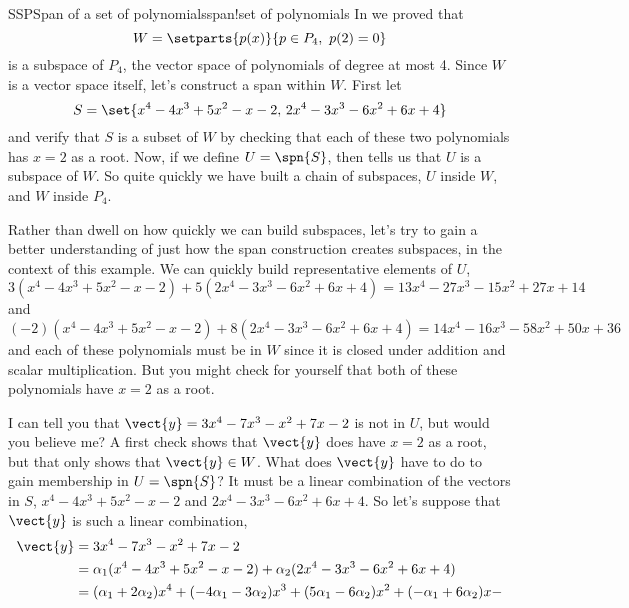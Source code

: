 \begin{example}{SSP}{Span of a set of polynomials}{span!set of polynomials}
In  we proved that
%
\begin{equation*}
W=\setparts{p(x)}{p\in P_4,\ p(2)=0}
\end{equation*}
%
is a subspace of $P_4$, the vector space of polynomials of degree at most 4.  Since $W$ is a vector space itself, let's construct a span within $W$.  First let
%
\begin{equation*}
S=\set{x^4-4x^3+5x^2-x-2,\,2x^4-3x^3-6x^2+6x+4}
\end{equation*}
%
and verify that $S$ is a subset of $W$ by checking that each of these two polynomials has $x=2$ as a root.  Now, if we define $U=\spn{S}$, then  tells us that $U$ is a subspace of $W$.  So quite quickly we have built a chain of subspaces, $U$ inside $W$, and $W$ inside $P_4$.\par
%
Rather than dwell on how quickly we can build subspaces, let's try to gain a better understanding of just how the span construction creates subspaces, in the context of this example.  We can quickly build representative elements of $U$,
%
\begin{equation*}
3(x^4-4x^3+5x^2-x-2)+5(2x^4-3x^3-6x^2+6x+4)=13x^4-27x^3-15x^2+27x+14
\end{equation*}
%
and
%
\begin{equation*}
(-2)(x^4-4x^3+5x^2-x-2)+8(2x^4-3x^3-6x^2+6x+4)=14x^4-16x^3-58x^2+50x+36
\end{equation*}
%
and each of these polynomials must be in $W$ since it is closed under addition and scalar multiplication.  But you might check for yourself that both of these polynomials have $x=2$ as a root.\par
%
I can tell you that $\vect{y}=3x^4-7x^3-x^2+7x-2$ is not in $U$, but would you believe me?  A first check shows that $\vect{y}$ does have $x=2$ as a root, but that only shows that $\vect{y}\in W$.  What does $\vect{y}$ have to do to gain membership in $U=\spn{S}$?  It must be a linear combination of the vectors in $S$, $x^4-4x^3+5x^2-x-2$ and $2x^4-3x^3-6x^2+6x+4$.  So let's suppose that $\vect{y}$ is such a linear combination,
%
\begin{align*}
\vect{y}
&=3x^4-7x^3-x^2+7x-2\\
&=\alpha_1(x^4-4x^3+5x^2-x-2)+\alpha_2(2x^4-3x^3-6x^2+6x+4)\\
&=
(\alpha_1+2\alpha_2)x^4+
(-4\alpha_1-3\alpha_2)x^3+
(5\alpha_1-6\alpha_2)x^2+
(-\alpha_1+6\alpha_2)x-

\end{align*}
\end{example}
